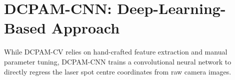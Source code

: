 \section{DCPAM-CNN: Deep-Learning-Based Approach}
\label{sec:cnn}

While DCPAM-CV relies on hand-crafted feature extraction
and manual parameter tuning,
DCPAM-CNN trains a convolutional neural network to directly
regress the laser spot centre coordinates from raw camera
images.

